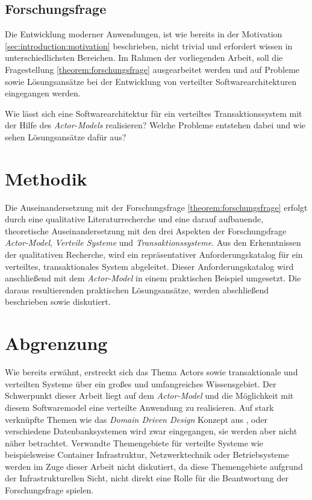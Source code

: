 \subsection{Forschungsfrage}\label{sec:introduction:forschungsfrage}
Die Entwicklung moderner Anwendungen, ist wie bereits in der Motivation \ref{sec:introduction:motivation} beschrieben, nicht trivial und erfordert wissen in unterschiedlichsten Bereichen. Im Rahmen der vorliegenden Arbeit, soll die Fragestellung \ref{theorem:forschungsfrage} ausgearbeitet werden und auf Probleme sowie Lösungsansätze bei der Entwicklung von verteilter Softwarearchitekturen eingegangen werden.
\begin{Theorem}
\label{theorem:forschungsfrage}
Wie lässt sich eine Softwarearchitektur für ein verteiltes Transaktionssystem mit der Hilfe des \textit{Actor-Models} realisieren? Welche Probleme entstehen dabei und wie sehen Lösungsansätze dafür aus?
\end{Theorem}

\section{Methodik}
Die Auseinandersetzung mit der Forschungsfrage \ref{theorem:forschungsfrage} erfolgt durch eine qualitative Literaturrecherche und eine darauf aufbauende, theoretische Auseinandersetzung mit den drei Aspekten der Forschungsfrage \textit{Actor-Model}, \textit{Verteile Systeme} und \textit{Transaktionssysteme}. Aus den Erkenntnissen der qualitativen Recherche, wird ein repräsentativer Anforderungskatalog für ein verteiltes, transaktionales System abgeleitet. Dieser Anforderungskatalog wird anschließend mit dem \textit{Actor-Model} in einem praktischen Beispiel umgesetzt. Die daraus resultierenden praktischen Lösungsansätze, werden abschließend beschrieben sowie diskutiert.
 
\section{Abgrenzung}
Wie bereits erwähnt, erstreckt sich das Thema Actors sowie transaktionale und verteilten Systeme über ein großes und umfangreiches Wissensgebiet. Der Schwerpunkt dieser Arbeit liegt auf dem \textit{Actor-Model} und die Möglichkeit mit diesem Softwaremodel eine verteilte Anwendung zu realisieren. Auf stark verknüpfte Themen wie das \textit{Domain Driven Design} Konzept aus \cite{Evans2004Domain-drivenSoftware}, oder verschiedene Datenbanksystemen wird zwar eingegangen, sie werden aber nicht näher betrachtet. Verwandte Themengebiete für verteilte Systeme wie beispielsweise Container Infrastruktur, Netzwerktechnik oder Betriebsysteme werden im Zuge dieser Arbeit nicht diskutiert, da diese Themengebiete aufgrund der Infrastrukturellen Sicht, nicht direkt eine Rolle für die Beantwortung der Forschungsfrage spielen. 

